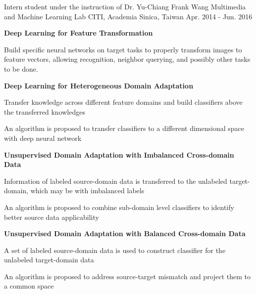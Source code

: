\documentclass[12pt, a4paper]{awesome-cv}
\begin{document}
\begin{cventries}
    \cventry
    {Intern student under the instruction of Dr. Yu-Chiang Frank Wang}
    {Multimedia and Machine Learning Lab}
    {CITI, Academia Sinica, Taiwan}
    {Apr. 2014 - Jun. 2016}
    {
        \begin{cvitems}
        \item{\bfseries Deep Learning for Feature Transformation}
            \begin{cvitems}
            \item{Build specific neural networks on target tasks to properly transform images to feature vectors, allowing recognition, neighbor querying, and possibly other tasks to be done.}
            \end{cvitems}
        \item{\bfseries Deep Learning for Heterogeneous Domain Adaptation}
            \begin{cvitems}
            \item{Transfer knowledge across different feature domains and build classifiers above the transferred knowledges}
            \item{An algorithm is proposed to transfer classifiers to a different dimensional space with deep neural network}
            \end{cvitems}
        \item{\bfseries Unsupervised Domain Adaptation with Imbalanced Cross-domain Data}
            \begin{cvitems}
            \item{Information of labeled source-domain data is transferred to the unlabeled target-domain, which may be with imbalanced labels}
            \item{An algorithm is proposed to combine sub-domain level classifiers to identify better source data applicability}
            \end{cvitems}
        \item{\bfseries Unsupervised Domain Adaptation with Balanced Cross-domain Data}
            \begin{cvitems}
            \item{A set of labeled source-domain data is used to construct classifier for the unlabeled target-domain data}
            \item{An algorithm is proposed to address source-target mismatch and project them to a common space}
            \end{cvitems}

\end{cvitems}}
\end{cventries}
\end{document}
